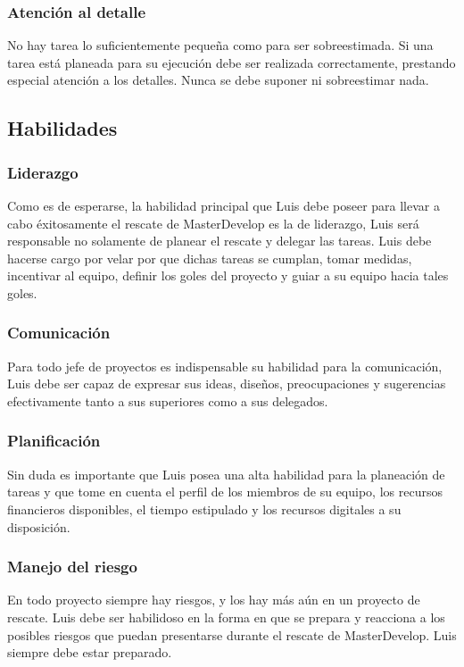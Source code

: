 \documentclass{article}
\begin{document}
    \subsubsection{Atención al detalle}
    No hay tarea lo suficientemente pequeña como para ser
    sobreestimada. Si una tarea está planeada para su ejecución debe
    ser realizada correctamente, prestando especial atención a los
    detalles. Nunca se debe suponer ni sobreestimar nada.

    \subsection{Habilidades}
    \subsubsection{Liderazgo}
    Como es de esperarse, la habilidad principal que Luis debe
    poseer para llevar a cabo éxitosamente el rescate de MasterDevelop
    es la de liderazgo, Luis será responsable no solamente de 
    planear el rescate y delegar las tareas. Luis debe hacerse 
    cargo por velar por que dichas tareas se cumplan, tomar medidas,
    incentivar al equipo, definir los goles del proyecto y guiar
    a su equipo hacia tales goles.
    \subsubsection{Comunicación}
    Para todo jefe de proyectos es indispensable su habilidad para la
    comunicación, Luis debe ser capaz de expresar sus ideas, diseños,
    preocupaciones y sugerencias efectivamente tanto a sus superiores
    como a sus delegados.
    \subsubsection{Planificación}
    Sin duda es importante que Luis posea una alta habilidad para
    la planeación de tareas y que tome en cuenta el perfil de los
    miembros de su equipo, los recursos financieros disponibles,
    el tiempo estipulado y los recursos digitales a su 
    disposición.
    \subsubsection{Manejo del riesgo}
    En todo proyecto siempre hay riesgos, y los hay más aún en un 
    proyecto de rescate. Luis debe ser habilidoso en la forma
    en que se prepara y reacciona a los posibles riesgos que puedan
    presentarse durante el rescate de MasterDevelop. Luis siempre
    debe estar preparado.
\end{document}
